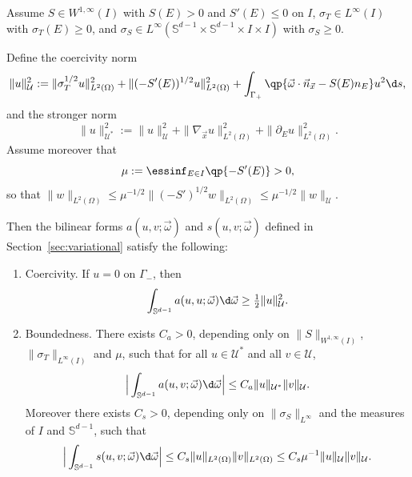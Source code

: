 \documentclass[final]{amsart}
\begin{document}
\begin{theorem}
\label{the:coercivity}
Assume $S\in W^{1,\infty}(I)$ with $S(E)>0$ and $S'(E)\le 0$ on $I$,
$\sigma_T\in L^\infty(I)$ with $\sigma_T(E)\ge 0$, and $\sigma_S\in
L^\infty(\mathbb{S}^{d-1}\times\mathbb{S}^{d-1}\times I\times I)$ with
$\sigma_S\ge 0$.

Define the coercivity norm
\begin{equation*}
  \|u\|_{\mathcal{U}}^2
  :=
  \|\sigma_T^{1/2}u\|_{L^2(\Omega)}^2
  + \|(-S'(E))^{1/2}u\|_{L^2(\Omega)}^2
  + \int_{\Gamma_+} \qp{\vec{\omega}\cdot\vec{n}_{\vec x} - S(E) n_E} u^2 \d s,
\end{equation*}
and the stronger norm
\begin{equation*}
  \|u\|_{\mathcal{U}^*}^2
  :=
  \|u\|_{\mathcal{U}}^2
  + \|\nabla_{\vec x} u\|_{L^2(\Omega)}^2
  + \|\partial_E u\|_{L^2(\Omega)}^2.
\end{equation*}
Assume moreover that
\begin{equation*}
  \mu := \essinf_{E\in I}\qp{-S'(E)} > 0,
\end{equation*}
so that $\|w\|_{L^2(\Omega)} \le
\mu^{-1/2}\|(-S')^{1/2}w\|_{L^2(\Omega)} \le
\mu^{-1/2}\|w\|_{\mathcal{U}}$.

Then the bilinear forms $a(u,v;\vec{\omega})$ and $s(u,v;\vec{\omega})$
defined in Section~\ref{sec:variational} satisfy the following:

\begin{enumerate}
\item
  Coercivity. If $u=0$ on $\Gamma_-$, then
  \begin{equation*}
    \int_{\mathbb{S}^{d-1}} a(u,u;\vec{\omega}) \d\vec{\omega}
    \ge
    \tfrac{1}{2}\|u\|_{\mathcal{U}}^2.
  \end{equation*}
  
\item Boundedness. There exists $C_a>0$, depending only on
  $\|S\|_{W^{1,\infty}(I)}$, $\|\sigma_T\|_{L^\infty(I)}$ and $\mu$, such
  that for all $u\in\mathcal{U}^*$ and all $v\in\mathcal{U}$,
  \begin{equation*}
    \Big|\int_{\mathbb{S}^{d-1}} a(u,v;\vec{\omega}) \d\vec{\omega}\Big|
    \le
    C_a \|u\|_{\mathcal{U}^*}\|v\|_{\mathcal{U}}.
  \end{equation*}
  Moreover there exists $C_s>0$, depending only on
  $\|\sigma_S\|_{L^\infty}$ and the measures of $I$ and $\mathbb{S}^{d-1}$,
  such that
  \begin{equation*}
    \Big|\int_{\mathbb{S}^{d-1}} s(u,v;\vec{\omega}) \d\vec{\omega}\Big|
    \le
    C_s \|u\|_{L^2(\Omega)}\|v\|_{L^2(\Omega)}
    \le
    C_s \mu^{-1}\|u\|_{\mathcal{U}}\|v\|_{\mathcal{U}}.
  \end{equation*}
\end{enumerate}

\end{theorem}
\end{document}
